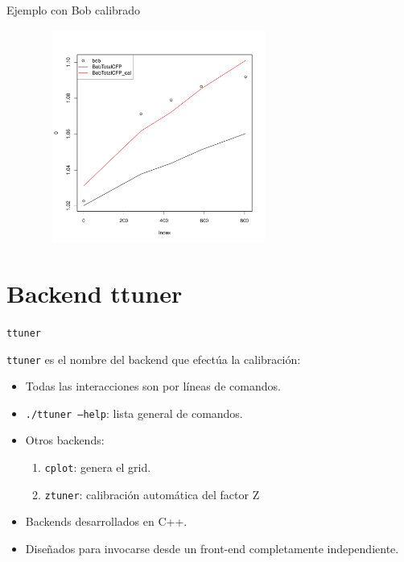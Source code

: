 \documentclass{beamer}
\begin{document}
\begin{frame}{Ejemplo con Bob calibrado}
 \begin{center}
  \includegraphics[width=10cm, height=7cm]{bob-cal}
 \end{center}
\end{frame}

\newcommand{\ttuner}{{\tt ttuner}\xspace}

\section{Backend ttuner}

\begin{frame}{\ttuner}
 
\ttuner es el nombre del backend que efectúa la calibración:

\begin{itemize}
 \item Todas las interacciones son por líneas de comandos.

 \item {\tt ./ttuner --help}: lista general de comandos.

 \item Otros backends:
       \begin{enumerate}
	\item {\tt cplot}: genera el grid.
	\item {\tt ztuner}: calibración automática del factor Z
       \end{enumerate}

 \item Backends desarrollados en C++.

 \item Diseñados para invocarse desde un front-end completamente independiente.

\end{itemize}
\end{frame}
\end{document}
